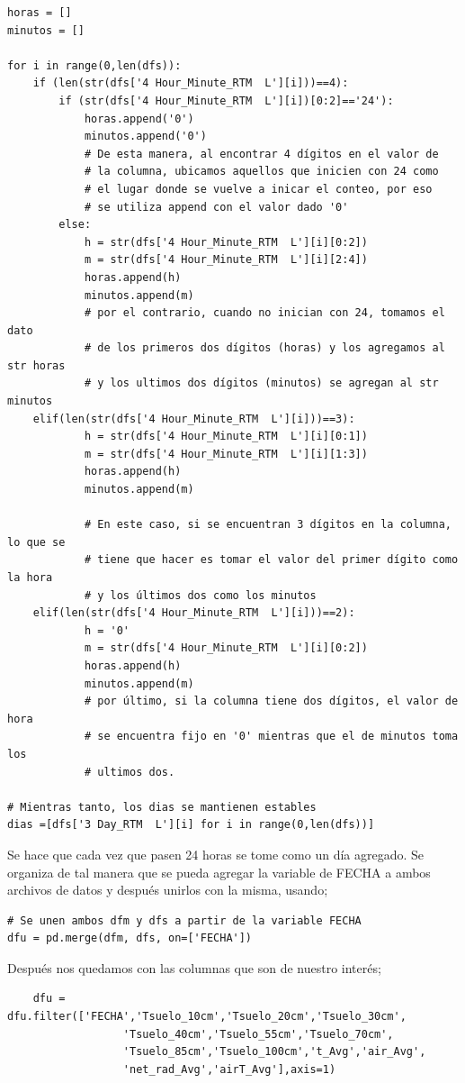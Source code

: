 \documentclass[11pt, spanish]{report}
\begin{document}
\begin{verbatim}
horas = []
minutos = []

for i in range(0,len(dfs)):
    if (len(str(dfs['4 Hour_Minute_RTM  L'][i]))==4):
        if (str(dfs['4 Hour_Minute_RTM  L'][i])[0:2]=='24'):
            horas.append('0')
            minutos.append('0')
            # De esta manera, al encontrar 4 dígitos en el valor de 
            # la columna, ubicamos aquellos que inicien con 24 como
            # el lugar donde se vuelve a inicar el conteo, por eso 
            # se utiliza append con el valor dado '0'
        else:
            h = str(dfs['4 Hour_Minute_RTM  L'][i][0:2])
            m = str(dfs['4 Hour_Minute_RTM  L'][i][2:4])
            horas.append(h)
            minutos.append(m)
            # por el contrario, cuando no inician con 24, tomamos el dato
            # de los primeros dos dígitos (horas) y los agregamos al str horas
            # y los ultimos dos dígitos (minutos) se agregan al str minutos
    elif(len(str(dfs['4 Hour_Minute_RTM  L'][i]))==3):
            h = str(dfs['4 Hour_Minute_RTM  L'][i][0:1])
            m = str(dfs['4 Hour_Minute_RTM  L'][i][1:3])
            horas.append(h)
            minutos.append(m)
    
            # En este caso, si se encuentran 3 dígitos en la columna, lo que se
            # tiene que hacer es tomar el valor del primer dígito como la hora
            # y los últimos dos como los minutos
    elif(len(str(dfs['4 Hour_Minute_RTM  L'][i]))==2):
            h = '0'
            m = str(dfs['4 Hour_Minute_RTM  L'][i][0:2])
            horas.append(h)
            minutos.append(m)
            # por último, si la columna tiene dos dígitos, el valor de hora
            # se encuentra fijo en '0' mientras que el de minutos toma los 
            # ultimos dos.
            
# Mientras tanto, los dias se mantienen estables
dias =[dfs['3 Day_RTM  L'][i] for i in range(0,len(dfs))]
\end{verbatim}
Se hace que cada vez que pasen 24 horas se tome como un día agregado. Se organiza de tal manera que se pueda agregar la variable de FECHA a ambos archivos de datos y después unirlos con la misma, usando;
\begin{verbatim}
# Se unen ambos dfm y dfs a partir de la variable FECHA
dfu = pd.merge(dfm, dfs, on=['FECHA'])
\end{verbatim}
Después nos quedamos con las columnas que son de nuestro interés;
\begin{verbatim}
    dfu = dfu.filter(['FECHA','Tsuelo_10cm','Tsuelo_20cm','Tsuelo_30cm',
                  'Tsuelo_40cm','Tsuelo_55cm','Tsuelo_70cm',
                  'Tsuelo_85cm','Tsuelo_100cm','t_Avg','air_Avg',
                  'net_rad_Avg','airT_Avg'],axis=1)
\end{verbatim}
\end{document}
